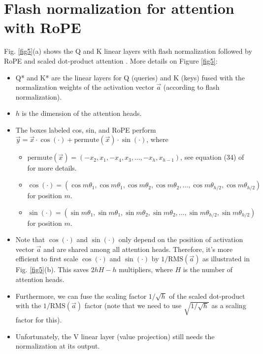 \documentclass{article}
\def\rms{\text{RMS}(\vec{a})}         %
\def\a{\vec{a}}                       %
\def\vx{\vec{x}}                      %
\def\vy{\vec{y}}                      %
\def\cosi{\cos{(\cdot)}}              %
\def\sini{\sin{(\cdot)}}              %
\begin{document}
\section{Flash normalization for attention with RoPE}
Fig. \ref{fig5}(a) shows the Q and K linear layers with flash normalization followed by RoPE \citep{RoPE} and scaled dot-product attention \citep{vanilla}. More details on Figure \ref{fig5}:
\begin{itemize}[topsep=-1pt, itemsep=-1pt]
  \item Q* and K* are the linear layers for Q (queries) and K (keys) fused with the normalization weights of the activation vector $\a$ (according to flash normalization).
  \item $h$ is the dimension of the attention heads.
  \item The boxes labeled cos, sin, and RoPE perform $\vy = \vx \cdot \cosi + \text{permute}(\vx) \cdot \sini$, where
  \begin{itemize}[topsep=-1pt, itemsep=-1pt]
    \item $\text{permute}(\vx) = (-x_2, x_1, -x_4, x_3, \dots, -x_h, x_{h-1})$, see equation (34) of \citep{RoPE} for more details.
    \item $\cosi = (\cos m \theta_1, \cos m \theta_1, \cos m \theta_2, \cos m \theta_2, \dots, \cos m \theta_{h/2}, \cos m \theta_{h/2})$ for position $m$.
    \item $\sini = (\sin m \theta_1, \sin m \theta_1, \sin m \theta_2, \sin m \theta_2, \dots, \sin m \theta_{h/2}, \sin m \theta_{h/2})$ for position $m$.
  \end{itemize}
  \item Note that $\cosi$ and $\sini$ only depend on the position of activation vector $\a$ and are shared among all attention heads. Therefore, it’s more efficient to first scale $\cosi$ and $\sini$ by $1/ \rms$ as illustrated in Fig. \ref{fig5}(b). This saves $2hH - h$ multipliers, where $H$ is the number of attention heads.
  \item Furthermore, we can fuse the scaling factor $1/ \sqrt{h}$ of the scaled dot-product with the $1/ \rms$ factor (note that we need to use $\sqrt{1/ \sqrt{h}}$ as a scaling factor for this).
  \item Unfortunately, the V linear layer (value projection) still needs the normalization at its output.
\end{itemize}
\end{document}
